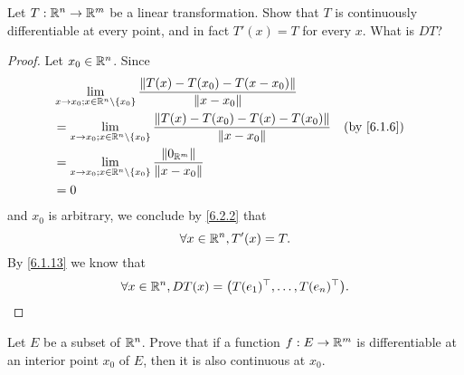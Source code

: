 \exercisesection

\begin{ex}\label{ex:6.4.1}
  Let \(T : \mathbb{R}^n \to \mathbb{R}^m\) be a linear transformation.
  Show that \(T\) is continuously differentiable at every point, and in fact \(T'(x) = T\) for every \(x\).
  What is \(D T\)?
\end{ex}

\begin{proof}
  Let \(x_0 \in \mathbb{R}^n\).
  Since
  \begin{align*}
     & \lim_{x \to x_0 ; x \in \R^n \setminus \set{x_0}} \dfrac{\norm*{T(x) - T(x_0) - T(x - x_0)}}{\norm*{x - x_0}}                      \\
     & = \lim_{x \to x_0 ; x \in \R^n \setminus \set{x_0}} \dfrac{\norm*{T(x) - T(x_0) - T(x) - T(x_0)}}{\norm*{x - x_0}} &  & \by{6.1.6} \\
     & = \lim_{x \to x_0 ; x \in \R^n \setminus \set{x_0}} \dfrac{\norm*{0_{\R^m}}}{\norm*{x - x_0}}                                      \\
     & = 0
  \end{align*}
  and \(x_0\) is arbitrary, we conclude by \cref{6.2.2} that
  \[
    \forall x \in \mathbb{R}^n, T'(x) = T.
  \]
  By \cref{6.1.13} we know that
  \[
    \forall x \in \mathbb{R}^n, D T(x) = \big(T(e_1)^\top, \dots, T(e_n)^\top\big).
  \]
\end{proof}

\begin{ex}\label{ex:6.4.2}
  Let \(E\) be a subset of \(\mathbb{R}^n\).
  Prove that if a function \(f : E \to \mathbb{R}^m\) is differentiable at an interior point \(x_0\) of \(E\), then it is also continuous at \(x_0\).
\end{ex}

